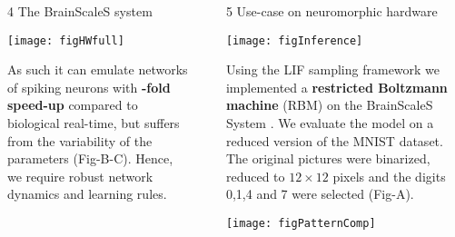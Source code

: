\begin{frame}
\begin{columns}
\begin{column}{0.99\textwidth}
\begin{columns}[t]
\begin{column}{0.32\textwidth}
\begin{block}{\large 4 The BrainScaleS system}
\begin{adjustwidth}{1.cm}{1.cm}
					\end{adjustwidth}

					\vspace{1.cm}
					\begin{center}
						\texttt{[image: figHWfull]}
					\end{center}

					\begin{adjustwidth}{1cm}{1cm}
					As such it can emulate networks of spiking neurons with \textbf{-fold speed-up} compared to biological real-time, but suffers from the variability of the parameters (Fig-B-C).
					Hence, we require robust network dynamics and learning rules.

					\end{adjustwidth}

					\blockSpaceOne
					\end{block}




				\end{column}

				\begin{column}{.01\textwidth}\end{column}

				\begin{column}{0.32\textwidth}

					\begin{block}{\large 5 Use-case on neuromorphic hardware}
					\blockSpaceTwo

					\begin{center}
						\texttt{[image: figInference]}
					\end{center}
					\thirdBlockImSpace

					\begin{adjustwidth}{1.cm}{1.cm}
					\justify
					 Using the LIF sampling framework we implemented a \textbf{restricted Boltzmann machine} (RBM) \cite{hinton1984boltzmann} on the BrainScaleS System \cite{kungl2019accelerated}.
					 We evaluate the model on a reduced version of the MNIST dataset.
					 The original pictures were binarized, reduced to $12\times12$ pixels and the digits 0,1,4 and 7 were selected (Fig-A).
					\end{adjustwidth}

					\thirdBlockImSpace
					\begin{center}
						\texttt{[image: figPatternComp]}
					\end{center}
					\thirdBlockImSpace



\end{block}
\end{column}
\end{columns}
\end{column}
\end{columns}
\end{frame}
